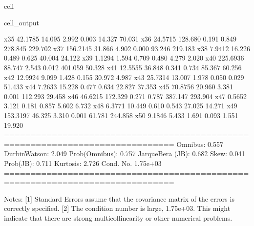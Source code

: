 \documentclass[letterpaper,10pt,english]{jupyterBook}
\begin{document}
\begin{sphinxuseclass}{cell}
\begin{sphinxVerbatimOutput}
\begin{sphinxuseclass}{cell_output}
\begin{sphinxVerbatim}[commandchars=\\\{\}]
x35           42.1785     14.095      2.992      0.003      14.327      70.031
x36          \PYGZhy{}24.5715    128.680     \PYGZhy{}0.191      0.849    \PYGZhy{}278.845     229.702
x37          156.2145     31.866      4.902      0.000      93.246     219.183
x38           \PYGZhy{}7.9412     16.226     \PYGZhy{}0.489      0.625     \PYGZhy{}40.004      24.122
x39           \PYGZhy{}1.1294      1.594     \PYGZhy{}0.709      0.480      \PYGZhy{}4.279       2.020
x40         \PYGZhy{}225.6936     88.747     \PYGZhy{}2.543      0.012    \PYGZhy{}401.059     \PYGZhy{}50.328
x41          \PYGZhy{}12.5555     36.848     \PYGZhy{}0.341      0.734     \PYGZhy{}85.367      60.256
x42          \PYGZhy{}12.9924      9.099     \PYGZhy{}1.428      0.155     \PYGZhy{}30.972       4.987
x43           25.7314     13.007      1.978      0.050       0.029      51.433
x44            7.2633     15.228      0.477      0.634     \PYGZhy{}22.827      37.353
x45          \PYGZhy{}70.8756     20.960     \PYGZhy{}3.381      0.001    \PYGZhy{}112.293     \PYGZhy{}29.458
x46          \PYGZhy{}46.6215    172.329     \PYGZhy{}0.271      0.787    \PYGZhy{}387.147     293.904
x47            0.5652      3.121      0.181      0.857      \PYGZhy{}5.602       6.732
x48           \PYGZhy{}6.3771     10.449     \PYGZhy{}0.610      0.543     \PYGZhy{}27.025      14.271
x49          153.3197     46.325      3.310      0.001      61.781     244.858
x50            9.1846      5.433      1.691      0.093      \PYGZhy{}1.551      19.920
==============================================================================
Omnibus:                        0.557   Durbin\PYGZhy{}Watson:                   2.049
Prob(Omnibus):                  0.757   Jarque\PYGZhy{}Bera (JB):                0.682
Skew:                          \PYGZhy{}0.041   Prob(JB):                        0.711
Kurtosis:                       2.726   Cond. No.                     1.75e+03
==============================================================================

Notes:
[1] Standard Errors assume that the covariance matrix of the errors is correctly specified.
[2] The condition number is large, 1.75e+03. This might indicate that there are
strong multicollinearity or other numerical problems.
\end{sphinxVerbatim}

\noindent{}

\end{sphinxuseclass}\end{sphinxVerbatimOutput}

\end{sphinxuseclass}
\end{document}
